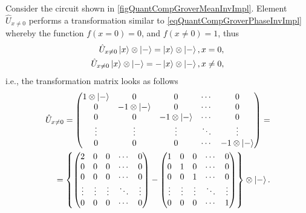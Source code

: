 

Consider the circuit shown in \autoref{figQuantCompGroverMeanInvImpl}. Element $\hat{U}_{x \ne 0}$ performs a transformation similar to \eqref{eqQuantCompGroverPhaseInvImpl} whereby the function $f\left(x = 0\right) = 0$, and $f\left(x \ne 0\right) = 1$, thus
\begin{eqnarray}
\hat{U}_{x \ne 0} \ket{x}\otimes\ket{-} 
= \ket{x}\otimes\ket{-}, x = 0,
\nonumber \\
\hat{U}_{x \ne 0} \ket{x}\otimes\ket{-} 
= - \ket{x}\otimes\ket{-}, x \ne 0,
\nonumber
\end{eqnarray}
i.e., the transformation matrix looks as follows
\begin{eqnarray}
\hat{U}_{x \ne 0} = 
\begin{pmatrix}
1 \otimes \ket{-} & 0 & 0 & \cdots & 0 \\
0 & -1 \otimes \ket{-}  & 0 & \cdots & 0 \\
0 & 0 & -1 \otimes \ket{-}   & \cdots & 0 \\
\vdots & \vdots & \vdots & \ddots & \vdots \\
0 & 0 & 0  & \cdots & -1 \otimes \ket{-}  \\
\end{pmatrix}
=
\nonumber \\
=
\left\{
\begin{pmatrix}
2  & 0 & 0 & \cdots & 0 \\
0 & 0 & 0 & \cdots & 0 \\
0 & 0 & 0 & \cdots & 0 \\
\vdots & \vdots & \vdots & \ddots & \vdots \\
0 & 0 & 0  & \cdots & 0 \\
\end{pmatrix} - 
\begin{pmatrix}
1 & 0 & 0 & \cdots & 0 \\
0 & 1 & 0 & \cdots & 0 \\
0 & 0 & 1 & \cdots & 0 \\
\vdots & \vdots & \vdots & \ddots & \vdots \\
0 & 0 & 0  & \cdots & 1  \\
\end{pmatrix}
\right\}
\otimes \ket{-} 
. 
\nonumber
\end{eqnarray}

